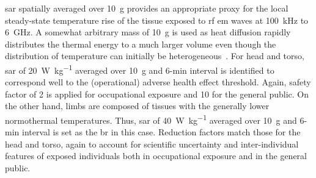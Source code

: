 \Gls{sar} spatially averaged over \SI{10}{\g} provides an appropriate proxy for the local steady-state temperature rise of the tissue exposed to \gls{rf} \gls{em} waves at \SI{100}{\kHz} to \SI{6}{\GHz}.
A somewhat arbitrary mass of \SI{10}{\g} is used as heat diffusion rapidly distributes the thermal energy to a much larger volume even though the distribution of temperature can initially be heterogeneous~\cite{Hirata2009correlation}.
For head and torso, \gls{sar} of \SI{20}{\watt\per\kg} averaged over \SI{10}{\g} and 6-min interval is identified to correspond well to the (operational) adverse health effect threshold.
Again, safety factor of 2 is applied for occupational exposure and 10 for the general public.
On the other hand, limbs are composed of tissues with the generally lower normothermal temperatures.
Thus, \gls{sar} of \SI{40}{\watt\per\kg} averaged over \SI{10}{\g} and 6-min interval is set as the \gls{br} in this case.
Reduction factors match those for the head and torso, again to account for scientific uncertainty and inter-individual features of exposed individuals both in occupational exposure and in the general public.

